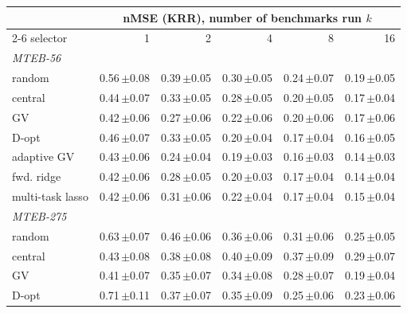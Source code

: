 \begin{tabular}{lrrrrr}
\toprule
 & \multicolumn{5}{c}{nMSE (KRR), number of benchmarks run $k$} \\
\cmidrule(lr){2-6}
selector & 1 & 2 & 4 & 8 & 16 \\
\midrule
\multicolumn{6}{l}{\emph{MTEB-56}} \\
random & 0.56\,{\scriptsize$\pm$0.08} & 0.39\,{\scriptsize$\pm$0.05} & 0.30\,{\scriptsize$\pm$0.05} & 0.24\,{\scriptsize$\pm$0.07} & 0.19\,{\scriptsize$\pm$0.05} \\
central & 0.44\,{\scriptsize$\pm$0.07} & 0.33\,{\scriptsize$\pm$0.05} & 0.28\,{\scriptsize$\pm$0.05} & 0.20\,{\scriptsize$\pm$0.05} & 0.17\,{\scriptsize$\pm$0.04} \\
GV & 0.42\,{\scriptsize$\pm$0.06} & 0.27\,{\scriptsize$\pm$0.06} & 0.22\,{\scriptsize$\pm$0.06} & 0.20\,{\scriptsize$\pm$0.06} & 0.17\,{\scriptsize$\pm$0.06} \\
D-opt & 0.46\,{\scriptsize$\pm$0.07} & 0.33\,{\scriptsize$\pm$0.05} & 0.20\,{\scriptsize$\pm$0.04} & 0.17\,{\scriptsize$\pm$0.04} & 0.16\,{\scriptsize$\pm$0.05} \\
adaptive GV & 0.43\,{\scriptsize$\pm$0.06} & 0.24\,{\scriptsize$\pm$0.04} & 0.19\,{\scriptsize$\pm$0.03} & 0.16\,{\scriptsize$\pm$0.03} & 0.14\,{\scriptsize$\pm$0.03} \\
fwd. ridge & 0.42\,{\scriptsize$\pm$0.06} & 0.28\,{\scriptsize$\pm$0.05} & 0.20\,{\scriptsize$\pm$0.03} & 0.17\,{\scriptsize$\pm$0.04} & 0.14\,{\scriptsize$\pm$0.04} \\
multi-task lasso & 0.42\,{\scriptsize$\pm$0.06} & 0.31\,{\scriptsize$\pm$0.06} & 0.22\,{\scriptsize$\pm$0.04} & 0.17\,{\scriptsize$\pm$0.04} & 0.15\,{\scriptsize$\pm$0.04} \\
\midrule
\multicolumn{6}{l}{\emph{MTEB-275}} \\
random & 0.63\,{\scriptsize$\pm$0.07} & 0.46\,{\scriptsize$\pm$0.06} & 0.36\,{\scriptsize$\pm$0.06} & 0.31\,{\scriptsize$\pm$0.06} & 0.25\,{\scriptsize$\pm$0.05} \\
central & 0.43\,{\scriptsize$\pm$0.08} & 0.38\,{\scriptsize$\pm$0.08} & 0.40\,{\scriptsize$\pm$0.09} & 0.37\,{\scriptsize$\pm$0.09} & 0.29\,{\scriptsize$\pm$0.07} \\
GV & 0.41\,{\scriptsize$\pm$0.07} & 0.35\,{\scriptsize$\pm$0.07} & 0.34\,{\scriptsize$\pm$0.08} & 0.28\,{\scriptsize$\pm$0.07} & 0.19\,{\scriptsize$\pm$0.04} \\
D-opt & 0.71\,{\scriptsize$\pm$0.11} & 0.37\,{\scriptsize$\pm$0.07} & 0.35\,{\scriptsize$\pm$0.09} & 0.25\,{\scriptsize$\pm$0.06} & 0.23\,{\scriptsize$\pm$0.06} \\

\end{tabular}
